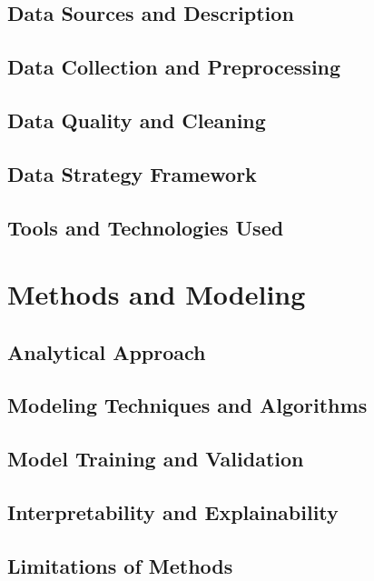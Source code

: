 \documentclass[11pt,a4paper]{article}
\begin{document}
\subsection{Data Sources and Description}

\subsection{Data Collection and Preprocessing}

\subsection{Data Quality and Cleaning}

\subsection{Data Strategy Framework}

\subsection{Tools and Technologies Used}


\section{Methods and Modeling}

\subsection{Analytical Approach}

\subsection{Modeling Techniques and Algorithms}

\subsection{Model Training and Validation}

\subsection{Interpretability and Explainability}

\subsection{Limitations of Methods}
\end{document}
